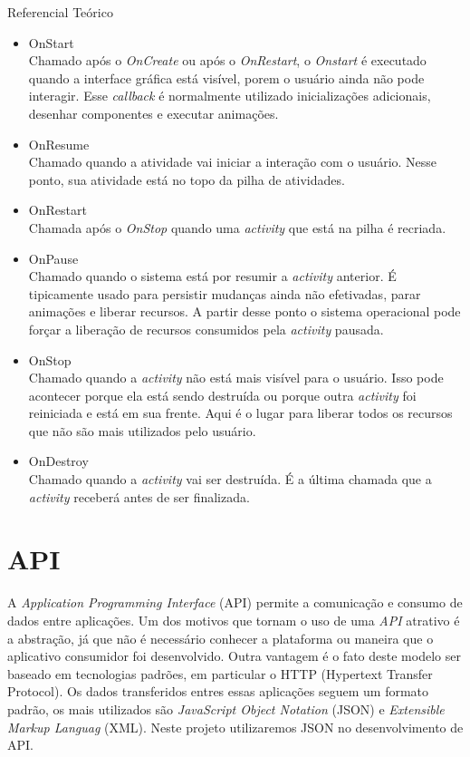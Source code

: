 \documentclass[
	12pt,				%
	openright,			%
	twoside,			%
	a4paper,			%
	english,			%
	french,				%
	spanish,			%
	brazil				%
	]{abntex2}
\begin{document}
\begin{chapter}{Referencial Teórico}
\begin{itemize}
     \newpage
     \item{OnStart} \\
     Chamado após o \textit{OnCreate} ou após o \textit{OnRestart}, o \textit{Onstart} é executado quando a interface gráfica está visível, porem o usuário ainda não pode interagir. Esse \textit{callback} é normalmente utilizado inicializações adicionais, desenhar componentes e executar animações.
     \item{OnResume} \\
      Chamado quando a atividade vai iniciar a interação com o usuário. Nesse ponto, sua atividade está no topo da pilha de atividades.
      \item{OnRestart} \\
      Chamada após o \textit{OnStop} quando uma \textit{activity} que está na pilha é recriada.
     \item{OnPause} \\
     Chamado quando o sistema está por resumir a \textit{activity} anterior. É tipicamente usado para persistir mudanças ainda não efetivadas, parar animações e liberar recursos. A partir desse ponto o sistema operacional pode forçar a liberação de recursos consumidos pela \textit{activity} pausada.
     \item{OnStop} \\
    Chamado quando a \textit{activity} não está mais visível para o usuário. Isso pode acontecer porque ela está sendo destruída ou porque outra  \textit{activity} foi reiniciada e está em sua frente. Aqui é o lugar para liberar todos os recursos que não são mais utilizados pelo usuário.
     \item{OnDestroy} \\
     Chamado quando a \textit{activity} vai ser destruída. É a última chamada que a \textit{activity} receberá antes de ser finalizada.
  \end{itemize}

\section{API} \label{API}
A \textit{Application Programming Interface} (API) permite a comunicação e consumo de dados entre aplicações. Um dos motivos que tornam o uso de uma \textit{API} atrativo é a abstração, já que não é necessário conhecer a plataforma ou maneira que o aplicativo consumidor foi desenvolvido. Outra vantagem é o fato deste modelo ser baseado em tecnologias padrões, em particular o HTTP (Hypertext Transfer Protocol). Os dados transferidos entres essas aplicações seguem um formato padrão, os mais utilizados são \textit{JavaScript Object Notation} (JSON) e \textit{Extensible Markup Languag} (XML). Neste projeto utilizaremos JSON no desenvolvimento de API.


\end{chapter}
\end{document}
